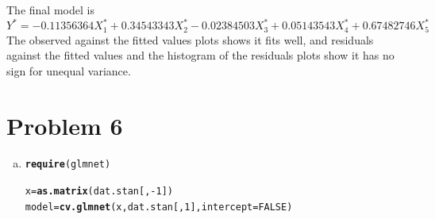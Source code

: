\documentclass{article}\usepackage[]{graphicx}\usepackage[]{color}
\makeatletter
\newcommand{\hlnum}[1]{\textcolor[rgb]{0.686,0.059,0.569}{#1}}%
\newcommand{\hlopt}[1]{\textcolor[rgb]{0,0,0}{#1}}%
\newcommand{\hlstd}[1]{\textcolor[rgb]{0.345,0.345,0.345}{#1}}%
\newcommand{\hlkwb}[1]{\textcolor[rgb]{0.69,0.353,0.396}{#1}}%
\newcommand{\hlkwc}[1]{\textcolor[rgb]{0.333,0.667,0.333}{#1}}%
\newcommand{\hlkwd}[1]{\textcolor[rgb]{0.737,0.353,0.396}{\textbf{#1}}}%
\newenvironment{kframe}{%
 \def\at@end@of@kframe{}%
 \ifinner\ifhmode%
  \def\at@end@of@kframe{\end{minipage}}%
  \begin{minipage}{\columnwidth}%
 \fi\fi%
 \def\FrameCommand##1{\hskip\@totalleftmargin \hskip-\fboxsep
 \colorbox{shadecolor}{##1}\hskip-\fboxsep
     \hskip-\linewidth \hskip-\@totalleftmargin \hskip\columnwidth}%
 \MakeFramed {\advance\hsize-\width
   \@totalleftmargin\z@ \linewidth\hsize
   \@setminipage}}%
 {\par\unskip\endMakeFramed%
 \at@end@of@kframe}
\newenvironment{knitrout}{}{} %
\makeatother
\begin{document}
\begin{enumerate}[(a)]
\begin{knitrout}
\end{knitrout}

\qquad The final model is $$Y^* = -0.11356364 X_1^* + 0.34543343 X_2^* -0.02384503 X_3^* + 0.05143543 X_4^* +0.67482746 X_5^* $$
\qquad The observed against the fitted values plots shows it fits well, and residuals against the fitted values and the histogram of the residuals plots show it has no sign for unequal variance.

\end{enumerate}

\section{Problem 6}

\begin{enumerate}[(a)]

\item

\begin{knitrout}
\color{fgcolor}\begin{kframe}
\begin{alltt}
  \hlkwd{require}\hlstd{(glmnet)}
\end{alltt}


{\ttfamily\noindent\itshape\color{messagecolor}{\#\# Loading required package: glmnet}}

{\ttfamily\noindent\color{warningcolor}{\#\# Warning: package 'glmnet' was built under R version 3.1.2}}

{\ttfamily\noindent\itshape\color{messagecolor}{\#\# Loading required package: Matrix}}

{\ttfamily\noindent\color{warningcolor}{\#\# Warning: package 'Matrix' was built under R version 3.1.2}}

{\ttfamily\noindent\itshape\color{messagecolor}{\#\# Loaded glmnet 1.9-8}}\begin{alltt}
  \hlstd{x} \hlkwb{=} \hlkwd{as.matrix}\hlstd{(dat.stan[,} \hlopt{-}\hlnum{1}\hlstd{])}
  \hlstd{model} \hlkwb{=} \hlkwd{cv.glmnet}\hlstd{(x, dat.stan[,} \hlnum{1}\hlstd{],} \hlkwc{intercept} \hlstd{=} \hlnum{FALSE}\hlstd{)}
\end{alltt}



\end{kframe}
\end{knitrout}
\end{enumerate}
\end{document}
